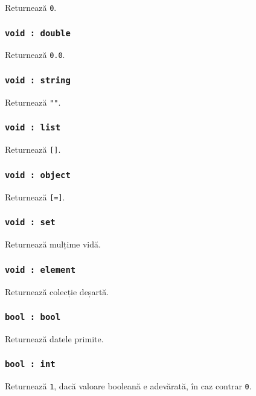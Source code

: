 Returnează \texttt{0}.

\subsubsection{\texttt{void : double}}

Returnează \texttt{0.0}.

\subsubsection{\texttt{void : string}}

Returnează \texttt{""}.

\subsubsection{\texttt{void : list}}

Returnează \texttt{[]}.

\subsubsection{\texttt{void : object}}

Returnează \texttt{[=]}.

\subsubsection{\texttt{void : set}}

Returnează mulțime vidă.

\subsubsection{\texttt{void : element}}

Returnează colecție deșartă.

\subsubsection{\texttt{bool : bool}}

Returnează datele primite.

\subsubsection{\texttt{bool : int}}

Returnează \texttt{1}, dacă valoare booleană e adevărată, în caz contrar \texttt{0}.


